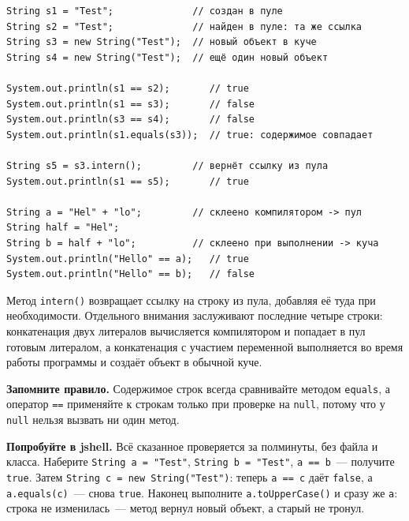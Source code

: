 \begin{listing}[H]
\begin{verbatim}
String s1 = "Test";              // создан в пуле
String s2 = "Test";              // найден в пуле: та же ссылка
String s3 = new String("Test");  // новый объект в куче
String s4 = new String("Test");  // ещё один новый объект

System.out.println(s1 == s2);       // true
System.out.println(s1 == s3);       // false
System.out.println(s3 == s4);       // false
System.out.println(s1.equals(s3));  // true: содержимое совпадает

String s5 = s3.intern();         // вернёт ссылку из пула
System.out.println(s1 == s5);       // true

String a = "Hel" + "lo";         // склеено компилятором -> пул
String half = "Hel";
String b = half + "lo";          // склеено при выполнении -> куча
System.out.println("Hello" == a);   // true
System.out.println("Hello" == b);   // false
\end{verbatim}
\caption{Пул строк, оператор == и метод equals}
\label{lst:02-8}
\end{listing}

Метод \texttt{intern()} возвращает ссылку на строку из пула, добавляя её туда
при необходимости. Отдельного внимания заслуживают последние четыре строки:
конкатенация двух литералов вычисляется компилятором и попадает в пул готовым
литералом, а конкатенация с участием переменной выполняется во время работы
программы и создаёт объект в обычной куче.

\begin{vrezka}
\textbf{Запомните правило.} Содержимое строк всегда сравнивайте методом
\texttt{equals}, а оператор \texttt{==} применяйте к строкам только при
проверке на \texttt{null}, потому что у \texttt{null} нельзя вызвать ни один
метод.
\end{vrezka}

\begin{vrezka}
\textbf{Попробуйте в jshell.} Всё сказанное проверяется за полминуты, без
файла и класса. Наберите \texttt{String a = "Test"},
\texttt{String b = "Test"}, \texttt{a == b}~--- получите \texttt{true}. Затем
\texttt{String c = new String("Test")}: теперь \texttt{a == c} даёт
\texttt{false}, а \texttt{a.equals(c)}~--- снова \texttt{true}. Наконец
выполните \texttt{a.toUpperCase()} и сразу же \texttt{a}: строка не
изменилась~--- метод вернул новый объект, а старый не тронул.
\end{vrezka}

